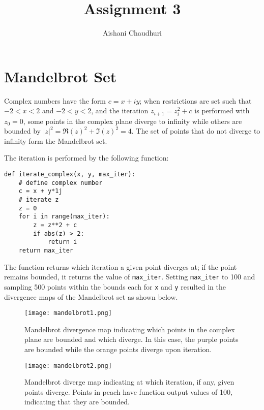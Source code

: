 \documentclass[12pt,a4paper]{article}
\title{Assignment 3}
\author{Aishani Chaudhuri}
\begin{document}
\date{\vspace{-5ex}}  %
\maketitle

\section{Mandelbrot Set}
Complex numbers have the form $c = x + iy$; when restrictions are set such that $-2 < x < 2$ and $-2 < y < 2$, and the iteration $z_{i+1} = z_i^2 + c$ is performed with $z_0 = 0$, some points in the complex plane diverge to infinity while others are bounded by $|z|^2 = \Re(z)^2 + \Im(z)^2 = 4$. The set of points that do not diverge to infinity form the Mandelbrot set.

The iteration is performed by the following function:

\begin{verbatim}
def iterate_complex(x, y, max_iter):
    # define complex number
    c = x + y*1j
    # iterate z
    z = 0
    for i in range(max_iter):
        z = z**2 + c
        if abs(z) > 2:
            return i
    return max_iter
\end{verbatim}

The function returns which iteration a given point diverges at; if the point remains bounded, it returns the value of \verb|max_iter|. Setting \verb|max_iter| to 100 and sampling 500 points within the bounds each for \verb|x| and \verb|y| resulted in the divergence maps of the Mandelbrot set as shown below.

\begin{figure}[htbp!]
\begin{center}
\texttt{[image: mandelbrot1.png]}
\end{center}
\caption{Mandelbrot divergence map indicating which points in the complex plane are bounded and which diverge. In this case, the purple points are bounded while the orange points diverge upon iteration.}
\label{fig:mandelbrot1}
\end{figure}

\begin{figure}[htbp!]
\begin{center}
\texttt{[image: mandelbrot2.png]}
\end{center}
\caption{Mandelbrot diverge map indicating at which iteration, if any, given points diverge. Points in peach have function output values of 100, indicating that they are bounded.}
\label{fig:mandelbrot2}
\end{figure}
\end{document}
